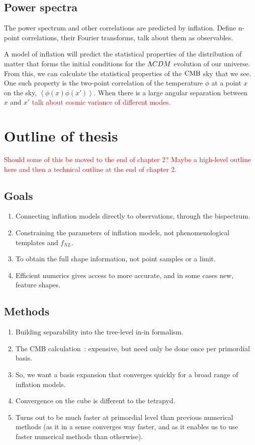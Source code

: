     \subsection{Power spectra}
    The power spectrum and other correlations
    are predicted by inflation. 
    Define n-point correlations, their Fourier transforms, talk about them as observables.
    

    A model of inflation will predict the statistical properties of the distribution of matter
    that forms the initial conditions for the $\Lambda CDM$ evolution of our universe.
    From this, we can calculate the statistical properties of the $\text{CMB}$ sky that we see.
    One such property is the two-point correlation of the temperature $\phi$
    at a point $x$ on the sky, $\left<\phi(x)\phi(x')\right>$. When there is a large
    angular separation between $x$ and $x'$ \textcolor{red}{talk about cosmic variance
    of different modes.}
\newpage
\section{Outline of thesis}
\textcolor{red}{Should some of this be moved to the end of chapter 2? Maybe a high-level outline here
and then a technical outline at the end of chapter 2.}
    \subsection{Goals}
    \begin{enumerate}
        \item Connecting inflation models directly to observations,
            through the bispectrum.
        \item Constraining the parameters of inflation models, not phenomenological templates and $f_{NL}$.
        \item To obtain the full shape information, not point samples or a limit.
        \item Efficient numerics gives access to more accurate, and in some cases new, feature shapes.
    \end{enumerate}
\newpage
    \subsection{Methods}
    \begin{enumerate}
        \item Building separability into the tree-level in-in formalism.
        \item The CMB calculation~\cite{Sohn_2021}: expensive, but need only be done once per primordial basis.
        \item So, we want a basis expansion that converges quickly for a broad range of inflation models.
        \item Convergence on the cube is different to the tetrapyd.
        \item Turns out to be much faster at primordial level than previous numerical methods
            (as it in a sense converges way faster, and as it enables us to use faster numerical methods than otherwise).
    \end{enumerate}
\newpage
